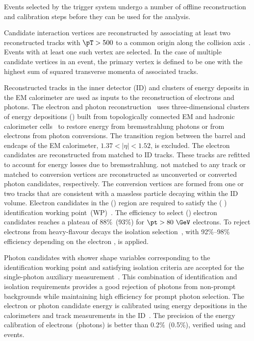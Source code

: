\documentclass[atlasdraft=false, cernpreprint, UKenglish, texmf, orcidlogo]{atlasdoc}
\begin{document}
 
Events selected by the trigger system undergo a number of offline reconstruction and calibration steps before they can be used for the analysis.
 
Candidate interaction vertices are reconstructed by associating at least two reconstructed tracks with $\pT > 500$ \MeV to a common origin along
the \pp{} collision axis~\cite{ATL-PHYS-PUB-2015-026}.
Events with at least one such vertex are selected.
In the case of multiple candidate vertices in an event, the primary vertex is defined to be one with the highest sum of squared transverse momenta of associated tracks.
 
Reconstructed tracks in the inner detector (ID) and clusters of energy deposits in the EM calorimeter are  used as inputs to the reconstruction
of electrons and photons.
The  electron and photon reconstruction~\cite{EGAM-2018-01} uses three-dimensional clusters of energy depositions (\topos)
built from topologically connected EM and hadronic calorimeter cells~\cite{PERF-2014-07} to restore energy from bremsstrahlung photons or
from electrons from photon conversions.
The  transition region between the barrel and endcaps of the EM calorimeter,  \(1.37<|\eta|<1.52\), is excluded.
The electron candidates are reconstructed from \topos{} matched to ID tracks.
These tracks are refitted to account for energy losses due to bremsstrahlung.
\Topos{} not matched to any track or matched to conversion vertices are reconstructed as unconverted or converted photon candidates, respectively.
The conversion vertices are formed from one or two tracks that are consistent with a massless   particle decaying within the ID volume.
Electron candidates in the \oneeljets (\twoeljets) region are required to satisfy the \tightID( \mediumID) identification  working point~(WP)~\cite{PERF-2017-03}.
The efficiency to select \tightID(\mediumID) electron candidates reaches a plateau of 88\%~(93\%) for \(\pt>80~\GeV\) electrons.
To reject electrons from  heavy-flavour decays the  isolation selection~\cite{EGAM-2018-01}, with 92\%--98\% efficiency
depending on the electron \pt, is applied.
 
Photon candidates with shower shape variables corresponding to the \tightID{} identification working point and satisfying \tightID
isolation criteria are accepted for the single-photon auxiliary measurement~\cite{EGAM-2018-01}.
This combination of identification and isolation  requirements provides a good rejection of photons from non-prompt backgrounds
while maintaining high efficiency for prompt photon selection.
The electron or photon candidate energy is calibrated using energy depositions in the calorimeters and track
measurements in the ID~\cite{EGAM-2018-01}.
The precision of the energy calibration of electrons~(photons) is better than 0.2\%~(0.5\%), verified \insitu using  \Zll and \Zllg events.
 
\end{document}
